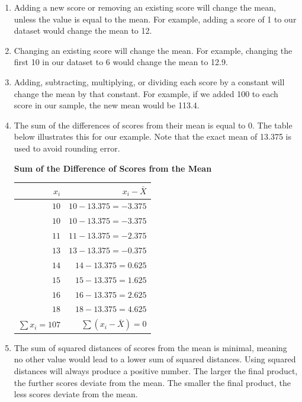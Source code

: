 \documentclass[
  letterpaper,
  DIV=11,
  numbers=noendperiod]{scrreprt}
\begin{document}
\begin{enumerate}
\def\labelenumi{\arabic{enumi}.}
\item
  Adding a new score or removing an existing score will change the mean,
  unless the value is equal to the mean. For example, adding a score of
  1 to our dataset would change the mean to 12.
\item
  Changing an existing score will change the mean. For example, changing
  the first 10 in our dataset to 6 would change the mean to 12.9.
\item
  Adding, subtracting, multiplying, or dividing each score by a constant
  will change the mean by that constant. For example, if we added 100 to
  each score in our sample, the new mean would be 113.4.
\item
  The sum of the differences of scores from their mean is equal to 0.
  The table below illustrates this for our example. Note that the exact
  mean of 13.375 is used to avoid rounding error.

  \textbf{Sum of the Difference of Scores from the Mean}

  \begin{longtable}[]{@{}rr@{}}
  \toprule\noalign{}
  \(x_i\) & \(x_i - \bar{X}\) \\
  \midrule\noalign{}
  \endhead
  \bottomrule\noalign{}
  \endlastfoot
  \(10\) & \(10 - 13.375 = -3.375\) \\
  \(10\) & \(10 - 13.375 = -3.375\) \\
  \(11\) & \(11 - 13.375 = -2.375\) \\
  \(13\) & \(13 - 13.375 = -0.375\) \\
  \(14\) & \(14 - 13.375 = 0.625\) \\
  \(15\) & \(15 - 13.375 = 1.625\) \\
  \(16\) & \(16 - 13.375 = 2.625\) \\
  \(18\) & \(18 - 13.375 = 4.625\) \\
  \textbf{\(\sum x_i = 107\)} & \textbf{\(\sum (x_i - \bar{X}) = 0\)} \\
  \end{longtable}
\item
  The sum of squared distances of scores from the mean is minimal,
  meaning no other value would lead to a lower sum of squared distances.
  Using squared distances will always produce a positive number. The
  larger the final product, the further scores deviate from the mean.
  The smaller the final product, the less scores deviate from the mean.


\end{enumerate}
\end{document}
